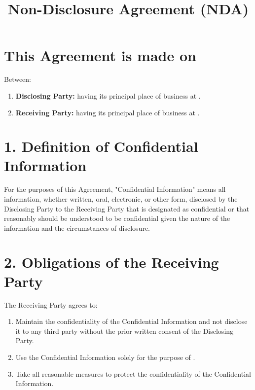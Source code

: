 \documentclass[12pt]{article}
\title{Non-Disclosure Agreement (NDA)}
\date{}
\begin{document}
\maketitle

\section*{This Agreement is made on \TextField[name=Date,width=2in]{}}

\noindent Between:

\begin{enumerate}
    \item \textbf{Disclosing Party:} \TextField[name=DisclosingPartyName,width=3in]{} having its principal place of business at \TextField[name=DisclosingPartyAddress,width=3in]{}.
    \item \textbf{Receiving Party:} \TextField[name=ReceivingPartyName,width=3in]{} having its principal place of business at \TextField[name=ReceivingPartyAddress,width=3in]{}.
\end{enumerate}

\section*{1. Definition of Confidential Information}
For the purposes of this Agreement, "Confidential Information" means all information, whether written, oral, electronic, or other form, disclosed by the Disclosing Party to the Receiving Party that is designated as confidential or that reasonably should be understood to be confidential given the nature of the information and the circumstances of disclosure.

\section*{2. Obligations of the Receiving Party}
The Receiving Party agrees to:
\begin{enumerate}
    \item Maintain the confidentiality of the Confidential Information and not disclose it to any third party without the prior written consent of the Disclosing Party.
    \item Use the Confidential Information solely for the purpose of \TextField[name=Purpose,width=3in]{}.
    \item Take all reasonable measures to protect the confidentiality of the Confidential Information.
\end{enumerate}
\end{document}
